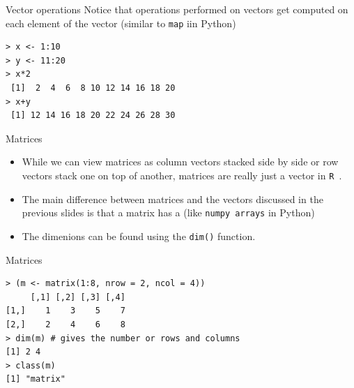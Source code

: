 \documentclass[xcolor=svgnames, 10pt]{beamer}
\newcommand{\R}{{\tt R }}
\begin{document}
\begin{frame}[fragile]{Vector operations}
Notice that operations performed on vectors get computed on each element of the vector (similar to {\tt map} iin Python)
\begin{Verbatim}[xleftmargin=0.4in]
> x <- 1:10
> y <- 11:20
> x*2
 [1]  2  4  6  8 10 12 14 16 18 20
> x+y
 [1] 12 14 16 18 20 22 24 26 28 30
\end{Verbatim}
\end{frame}


\begin{frame}[fragile]{Matrices}
\begin{itemize}
\item While we can view matrices as column vectors stacked side by side or row vectors stack one on top of another, matrices are really just a vector in \R.
\item The main difference between matrices and the vectors discussed in the previous slides is that a matrix has a  (like {\tt numpy arrays} in Python)
\item The dimenions can be found using the {\tt dim()} function. 
\end{itemize}
\end{frame}


\begin{frame}[fragile]{Matrices}
\begin{Verbatim}[xleftmargin=0.4in]
> (m <- matrix(1:8, nrow = 2, ncol = 4))
     [,1] [,2] [,3] [,4]
[1,]    1    3    5    7
[2,]    2    4    6    8
> dim(m) # gives the number or rows and columns
[1] 2 4
> class(m)
[1] "matrix"
\end{Verbatim}
\end{frame}
\end{document}
